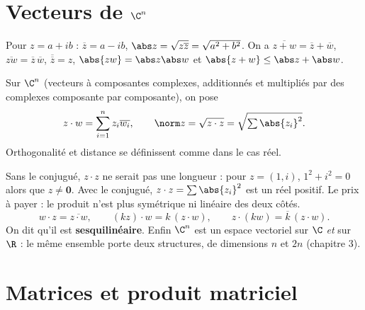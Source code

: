 \section{Vecteurs de $\C^n$}
\begin{remarque}[Rappels]
Pour $z=a+ib$ : $\overline z=a-ib$, $\abs z=\sqrt{z\overline z}=\sqrt{a^2+b^2}$. On a $\overline{z+w}=\overline z+\overline w$, $\overline{zw}=\overline z\,\overline w$, $\overline{\overline z}=z$, $\abs{zw}=\abs z\abs w$ et $\abs{z+w}\le\abs z+\abs w$.
\end{remarque}
\begin{definition}
Sur $\C^n$ (vecteurs à composantes complexes, additionnés et multipliés par des complexes composante par composante), on pose
\[z\cdot w=\sum_{i=1}^n z_i\overline{w_i},\qquad\norm z=\sqrt{z\cdot z}=\sqrt{\textstyle\sum\abs{z_i}^2}.\]
Orthogonalité et distance se définissent comme dans le cas réel.
\end{definition}
\begin{attention}
Sans le conjugué, $z\cdot z$ ne serait pas une longueur : pour $z=(1,i)$, $1^2+i^2=0$ alors que $z\neq\mathbf 0$. Avec le conjugué, $z\cdot z=\sum\abs{z_i}^2$ est un réel positif. Le prix à payer : le produit n'est plus symétrique ni linéaire des deux côtés.
\[w\cdot z=\overline{z\cdot w},\qquad (kz)\cdot w=k\,(z\cdot w),\qquad z\cdot(kw)=\overline k\,(z\cdot w).\]
On dit qu'il est \textbf{sesquilinéaire}. Enfin $\C^n$ est un espace vectoriel sur $\C$ \emph{et} sur $\R$ : le même ensemble porte deux structures, de dimensions $n$ et $2n$ (chapitre 3).
\end{attention}

\section{Matrices et produit matriciel}
